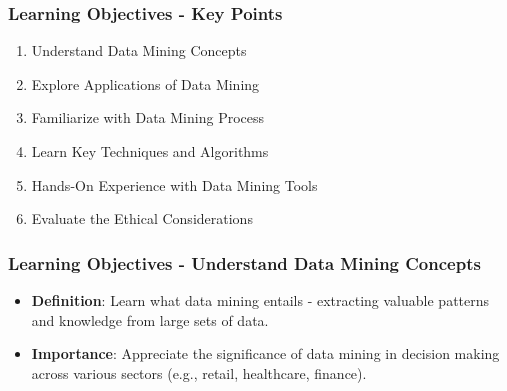 \documentclass{beamer}
\begin{document}
\begin{frame}[fragile]
    \frametitle{Learning Objectives - Key Points}
    \begin{enumerate}
        \item Understand Data Mining Concepts
        \item Explore Applications of Data Mining
        \item Familiarize with Data Mining Process
        \item Learn Key Techniques and Algorithms
        \item Hands-On Experience with Data Mining Tools
        \item Evaluate the Ethical Considerations
    \end{enumerate}
\end{frame}

\begin{frame}[fragile]
    \frametitle{Learning Objectives - Understand Data Mining Concepts}
    \begin{itemize}
        \item \textbf{Definition}: Learn what data mining entails - extracting valuable patterns and knowledge from large sets of data.
        \item \textbf{Importance}: Appreciate the significance of data mining in decision making across various sectors (e.g., retail, healthcare, finance).
    \end{itemize}
\end{frame}
\end{document}
